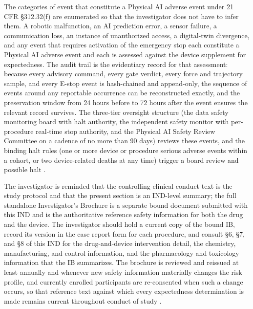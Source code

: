 The categories of event that constitute a Physical AI adverse event under 21 CFR
\S 312.32(f) are enumerated so that the investigator does not have to infer them.
A robotic malfunction, an AI prediction error, a sensor failure, a communication
loss, an instance of unauthorized access, a digital-twin divergence, and any event
that requires activation of the emergency stop each constitute a Physical AI adverse
event and each is assessed against the device supplement for expectedness. The
audit trail is the evidentiary record for that assessment: because every advisory
command, every gate verdict, every force and trajectory sample, and every E-stop
event is hash-chained and append-only, the sequence of events around any reportable
occurrence can be reconstructed exactly, and the preservation window from 24 hours
before to 72 hours after the event ensures the relevant record survives. The
three-tier oversight structure (the data safety monitoring board with halt
authority, the independent safety monitor with per-procedure real-time stop
authority, and the Physical AI Safety Review Committee on a cadence of no more than
90 days) reviews these events, and the binding halt rules (one or more device or
procedure serious adverse events within a cohort, or two device-related deaths at
any time) trigger a board review and possible halt \cite{cfr312paiuni,clintrustpai,paiautospons}.

The investigator is reminded that the controlling clinical-conduct text is the
study protocol and that the present section is an IND-level summary; the full
standalone Investigator's Brochure is a separate bound document submitted with this
IND and is the authoritative reference safety information for both the drug and the
device. The investigator should hold a current copy of the bound IB, record its
version in the case report form for each procedure, and consult \S 6, \S 7, and
\S 8 of this IND for the drug-and-device intervention detail, the chemistry,
manufacturing, and control information, and the pharmacology and toxicology
information that the IB summarizes. The brochure is reviewed and reissued at least
annually and whenever new safety information materially changes the risk profile,
and currently enrolled participants are re-consented when such a change occurs, so
that reference text against which every expectedness determination is made
remains current throughout conduct of study
\cite{phase1guidance,daraxwhipple,oncotrialllm}.
